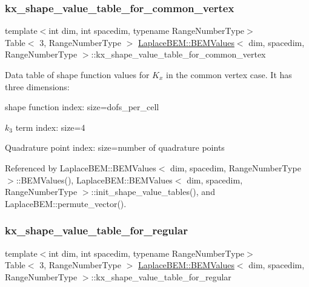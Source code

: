 \subsubsection{\texorpdfstring{kx\+\_\+shape\+\_\+value\+\_\+table\+\_\+for\+\_\+common\+\_\+vertex}{kx\_shape\_value\_table\_for\_common\_vertex}}
{\footnotesize\ttfamily template$<$int dim, int spacedim, typename Range\+Number\+Type$>$ \\
Table$<$ 3, Range\+Number\+Type $>$ \hyperlink{classLaplaceBEM_1_1BEMValues}{Laplace\+B\+E\+M\+::\+B\+E\+M\+Values}$<$ dim, spacedim, Range\+Number\+Type $>$\+::kx\+\_\+shape\+\_\+value\+\_\+table\+\_\+for\+\_\+common\+\_\+vertex}

Data table of shape function values for $K_x$ in the common vertex case. It has three dimensions\+:
\begin{DoxyEnumerate}
\item shape function index\+: size={\ttfamily dofs\+\_\+per\+\_\+cell} 
\item $k_3$ term index\+: size=4
\item Quadrature point index\+: size=number of quadrature points 
\end{DoxyEnumerate}

Referenced by Laplace\+B\+E\+M\+::\+B\+E\+M\+Values$<$ dim, spacedim, Range\+Number\+Type $>$\+::\+B\+E\+M\+Values(), Laplace\+B\+E\+M\+::\+B\+E\+M\+Values$<$ dim, spacedim, Range\+Number\+Type $>$\+::init\+\_\+shape\+\_\+value\+\_\+tables(), and Laplace\+B\+E\+M\+::permute\+\_\+vector().

\mbox{\label{classLaplaceBEM_1_1BEMValues_a8bc399c98420015f7f7f50185da924e1}} 
\subsubsection{\texorpdfstring{kx\+\_\+shape\+\_\+value\+\_\+table\+\_\+for\+\_\+regular}{kx\_shape\_value\_table\_for\_regular}}
{\footnotesize\ttfamily template$<$int dim, int spacedim, typename Range\+Number\+Type$>$ \\
Table$<$ 3, Range\+Number\+Type $>$ \hyperlink{classLaplaceBEM_1_1BEMValues}{Laplace\+B\+E\+M\+::\+B\+E\+M\+Values}$<$ dim, spacedim, Range\+Number\+Type $>$\+::kx\+\_\+shape\+\_\+value\+\_\+table\+\_\+for\+\_\+regular}

